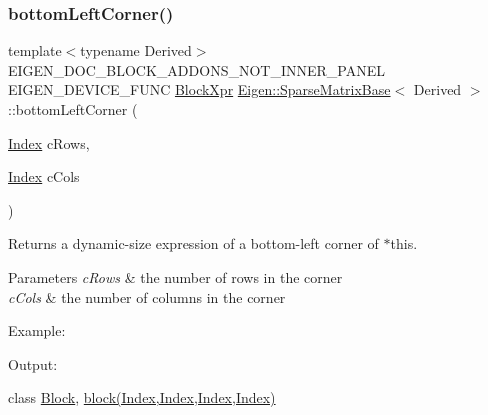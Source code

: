 \subsubsection{\texorpdfstring{bottomLeftCorner()}{bottomLeftCorner()}\hspace{0.1cm}{\footnotesize\ttfamily [1/3]}}
{\footnotesize\ttfamily template$<$typename Derived$>$ \\
E\+I\+G\+E\+N\+\_\+\+D\+O\+C\+\_\+\+B\+L\+O\+C\+K\+\_\+\+A\+D\+D\+O\+N\+S\+\_\+\+N\+O\+T\+\_\+\+I\+N\+N\+E\+R\+\_\+\+P\+A\+N\+EL E\+I\+G\+E\+N\+\_\+\+D\+E\+V\+I\+C\+E\+\_\+\+F\+U\+NC \mbox{\hyperlink{class_eigen_1_1_block}{Block\+Xpr}} \mbox{\hyperlink{class_eigen_1_1_sparse_matrix_base}{Eigen\+::\+Sparse\+Matrix\+Base}}$<$ Derived $>$\+::bottom\+Left\+Corner (\begin{DoxyParamCaption}\item[{\mbox{\hyperlink{struct_eigen_1_1_eigen_base_a554f30542cc2316add4b1ea0a492ff02}{Index}}}]{c\+Rows,  }\item[{\mbox{\hyperlink{struct_eigen_1_1_eigen_base_a554f30542cc2316add4b1ea0a492ff02}{Index}}}]{c\+Cols }\end{DoxyParamCaption})\hspace{0.3cm}{\ttfamily [inline]}}

\begin{DoxyReturn}{Returns}
a dynamic-\/size expression of a bottom-\/left corner of $\ast$this.
\end{DoxyReturn}

\begin{DoxyParams}{Parameters}
{\em c\+Rows} & the number of rows in the corner \\
\hline
{\em c\+Cols} & the number of columns in the corner\\
\hline
\end{DoxyParams}
Example\+: 
\begin{DoxyCodeInclude}{0}
\end{DoxyCodeInclude}
 Output\+: 
\begin{DoxyVerbInclude}
\end{DoxyVerbInclude}
 class \mbox{\hyperlink{class_eigen_1_1_block}{Block}}, \mbox{\hyperlink{class_eigen_1_1_sparse_matrix_base_a7c28a2f511181c727396d5e813519d38}{block(\+Index,\+Index,\+Index,\+Index)}} \mbox{\label{class_eigen_1_1_sparse_matrix_base_af0e6f2ff2f449cae8f7b19bd34dec4ce}} 
